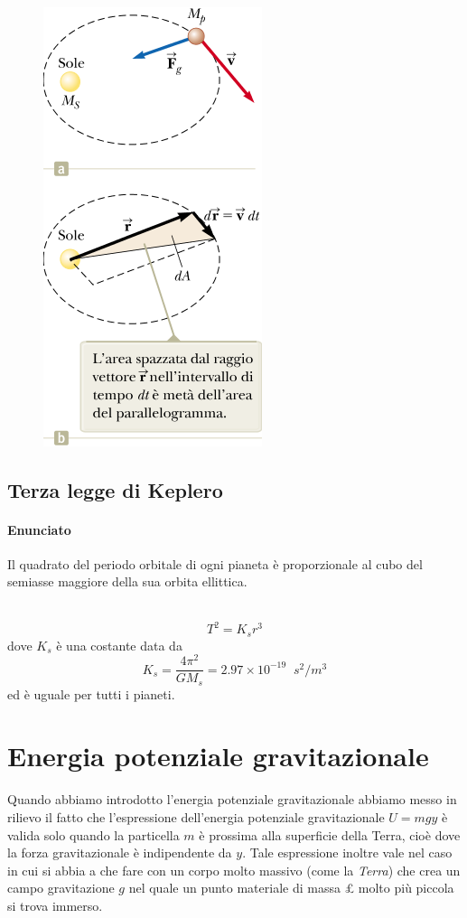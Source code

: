 \documentclass[a4paper,11pt,oneside]{book}
\begin{document}
~\newline
\begin{figure}[h]
    \includegraphics[scale=0.5]{seconda_legge_keplero.png}
    \centering
\end{figure}

\subsection{Terza legge di Keplero}
\paragraph{Enunciato} Il quadrato del periodo orbitale di ogni pianeta è proporzionale al cubo del semiasse maggiore della sua orbita ellittica.

~\newline
\begin{equation*}
    T^2 = K_s r^3
\end{equation*}
dove $K_s$ è una costante data da 
\begin{equation*}
    K_s = \frac{4\pi^2}{GM_s} = 2.97 \times 10^{-19} \;\; s^2/m^3
\end{equation*}
ed è uguale per tutti i pianeti.

\section{Energia potenziale gravitazionale}
Quando abbiamo introdotto l'energia potenziale gravitazionale abbiamo messo in rilievo il fatto che l’espressione dell’energia potenziale gravitazionale 
$U = mgy$ è valida solo quando la particella $m$ è prossima alla superficie della Terra, cioè dove la forza gravitazionale è indipendente da $y$.
Tale espressione inoltre vale nel caso in cui si abbia a che fare con un corpo molto massivo (come la \emph{Terra}) che crea un campo gravitazione $g$ nel quale un 
punto materiale di massa £ molto più piccola si trova immerso.
\end{document}
